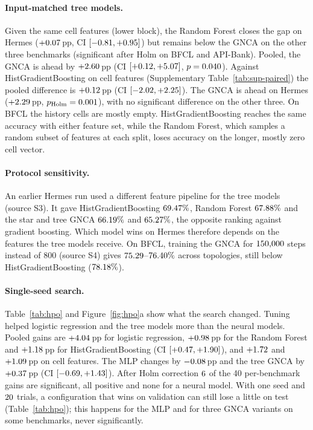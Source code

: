 \documentclass[10pt,twocolumn,letterpaper]{article}
\begin{document}
\paragraph{Input-matched tree models.} Given the same cell features (lower block), the Random Forest closes the gap on Hermes ($+0.07$\,pp, CI $[-0.81, +0.95]$) but remains below the GNCA on the other three benchmarks (significant after Holm on BFCL and API-Bank). Pooled, the GNCA is ahead by $+2.60$\,pp (CI $[+0.12, +5.07]$, $p=0.040$). Against HistGradientBoosting on cell features (Supplementary Table~\ref{tab:sup-paired}) the pooled difference is $+0.12$\,pp (CI $[-2.02, +2.25]$). The GNCA is ahead on Hermes ($+2.29$\,pp, $p_{\text{Holm}}=0.001$), with no significant difference on the other three. On BFCL the history cells are mostly empty. HistGradientBoosting reaches the same accuracy with either feature set, while the Random Forest, which samples a random subset of features at each split, loses accuracy on the longer, mostly zero cell vector.
\paragraph{Protocol sensitivity.} An earlier Hermes run used a different feature pipeline for the tree models (source S3). It gave HistGradientBoosting $69.47\%$, Random Forest $67.88\%$ and the star and tree GNCA $66.19\%$ and $65.27\%$, the opposite ranking against gradient boosting. Which model wins on Hermes therefore depends on the features the tree models receive. On BFCL, training the GNCA for $150{,}000$ steps instead of 800 (source S4) gives $75.29$--$76.40\%$ across topologies, still below HistGradientBoosting ($78.18\%$).

\paragraph{Single-seed search.} Table~\ref{tab:hpo} and Figure~\ref{fig:hpo}a show what the search changed. Tuning helped logistic regression and the tree models more than the neural models. Pooled gains are $+4.04$\,pp for logistic regression, $+0.98$\,pp for the Random Forest and $+1.18$\,pp for HistGradientBoosting (CI $[+0.47, +1.90]$), and $+1.72$ and $+1.09$\,pp on cell features. The MLP changes by $-0.08$\,pp and the tree GNCA by $+0.37$\,pp (CI $[-0.69, +1.43]$). After Holm correction $6$ of the 40 per-benchmark gains are significant, all positive and none for a neural model. With one seed and $20$ trials, a configuration that wins on validation can still lose a little on test (Table~\ref{tab:hpo}); this happens for the MLP and for three GNCA variants on some benchmarks, never significantly.
\end{document}
